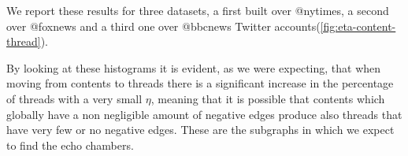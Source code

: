 We report these results for
three datasets, a first built over @nytimes, a second over @foxnews
and a third one over @bbcnews Twitter accounts\footnotemark (\autoref{fig:eta-content-thread}).


By looking at these histograms it is evident, as we were expecting, that when
moving from
contents to threads there is a significant increase in the percentage of
threads with a very small $\eta$, meaning that it is possible that contents which
globally have
a non negligible amount of negative edges produce also threads that have
very few or no negative edges. These are the subgraphs in which we expect to find the echo chambers.

